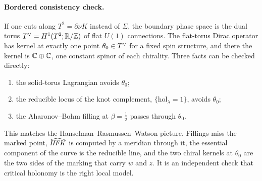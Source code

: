 \paragraph{Bordered consistency check.}  If one cuts along $T^2=\partial\nu K$ instead of $\Sigma$, the boundary phase space is the
dual torus $T^{\vee}=H^1(T^2;\mathbb{R}/\mathbb{Z})$ of flat $U(1)$ connections.  The flat-torus Dirac operator has kernel at exactly one point
$\theta_0\in T^{\vee}$ for a fixed spin structure, and there the kernel is $\mathbb{C}\oplus\mathbb{C}$, one constant spinor of each chirality.  Three
facts can be checked directly:
\begin{enumerate}[label=(\arabic*)]
\item the solid-torus Lagrangian avoids $\theta_0$;
\item the reducible locus of the knot complement, $\{\mathrm{hol}_\lambda=1\}$, avoids $\theta_0$;
\item the Aharonov--Bohm filling at $\beta=\frac12$ passes through $\theta_0$.
\end{enumerate}
This matches the Hanselman--Rasmussen--Watson picture.  Fillings miss the marked point, $\widehat{\mathit{HFK}}$ is computed by a meridian
through it, the essential component of the curve is the reducible line, and the two chiral kernels at $\theta_0$ are the two
sides of the marking that carry $w$ and $z$.  It is an independent check that critical holonomy is the right local
model.

